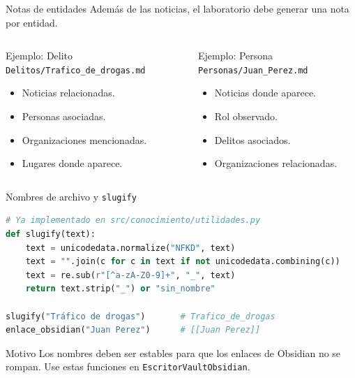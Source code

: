 \documentclass[11pt,aspectratio=169]{beamer}
\newcommand{\code}[1]{\texttt{#1}}
\begin{document}
\begin{frame}{Notas de entidades}
\small
Además de las noticias, el laboratorio debe generar una nota por entidad.

\vspace{0.2cm}
\begin{columns}[T,onlytextwidth]
\begin{block}{Ejemplo: Delito}
\scriptsize
\code{Delitos/Trafico\_de\_drogas.md}
\begin{itemize}
\item Noticias relacionadas.
\item Personas asociadas.
\item Organizaciones mencionadas.
\item Lugares donde aparece.
\end{itemize}
\end{block}
\begin{alertblock}{Ejemplo: Persona}
\scriptsize
\code{Personas/Juan\_Perez.md}
\begin{itemize}
\item Noticias donde aparece.
\item Rol observado.
\item Delitos asociados.
\item Organizaciones relacionadas.
\end{itemize}
\end{alertblock}
\end{columns}
\end{frame}

\begin{frame}[fragile]{Nombres de archivo y \texttt{slugify}}
\tiny
\begin{lstlisting}[language=Python]
# Ya implementado en src/conocimiento/utilidades.py
def slugify(text):
    text = unicodedata.normalize("NFKD", text)
    text = "".join(c for c in text if not unicodedata.combining(c))
    text = re.sub(r"[^a-zA-Z0-9]+", "_", text)
    return text.strip("_") or "sin_nombre"

slugify("Tráfico de drogas")       # Trafico_de_drogas
enlace_obsidian("Juan Perez")      # [[Juan Perez]]
\end{lstlisting}

\scriptsize
\begin{block}{Motivo}
Los nombres deben ser estables para que los enlaces de Obsidian no se rompan. Use estas funciones en \code{EscritorVaultObsidian}.
\end{block}
\end{frame}
\end{document}
